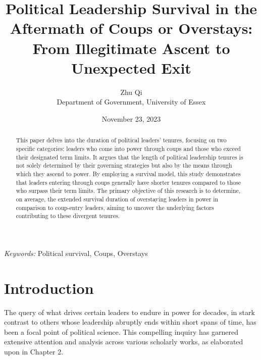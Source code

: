 \documentclass[
  12pt,
  a4paper,
  12pt]{article}
\begin{document}
\def\spacingset#1{\renewcommand{\baselinestretch}%
{#1}\small\normalsize} \spacingset{1}



\date{November 23, 2023}
\title{\bf Political Leadership Survival in the Aftermath of Coups or
Overstays: From Illegitimate Ascent to Unexpected Exit}
\author{
Zhu Qi\\
Department of Government, University of Essex\\
}
\maketitle

\bigskip
\bigskip
\begin{abstract}
This paper delves into the duration of political leaders' tenures,
focusing on two specific categories: leaders who come into power through
coups and those who exceed their designated term limits. It argues that
the length of political leadership tenures is not solely determined by
their governing strategies but also by the means through which they
ascend to power. By employing a survival model, this study demonstrates
that leaders entering through coups generally have shorter tenures
compared to those who surpass their term limits. The primary objective
of this research is to determine, on average, the extended survival
duration of overstaying leaders in power in comparison to coup-entry
leaders, aiming to uncover the underlying factors contributing to these
divergent tenures.
\end{abstract}

\noindent%
{\it Keywords:} Political survival, Coups, Overstays
\vfill

\newpage
\spacingset{1.9} %
\ifdefined\Shaded\renewenvironment{Shaded}{\begin{tcolorbox}[enhanced, borderline west={3pt}{0pt}{shadecolor}, boxrule=0pt, breakable, interior hidden, sharp corners, frame hidden]}{\end{tcolorbox}}\fi

\hypertarget{introduction}{%
\section{Introduction}\label{introduction}}

The query of what drives certain leaders to endure in power for decades,
in stark contrast to others whose leadership abruptly ends within short
spans of time, has been a focal point of political science. This
compelling inquiry has garnered extensive attention and analysis across
various scholarly works, as elaborated upon in Chapter 2.
\end{document}
